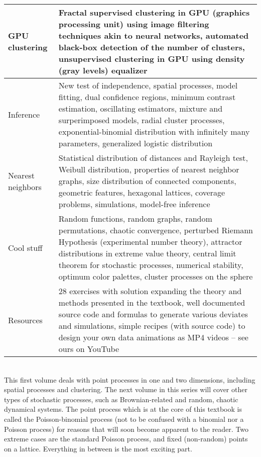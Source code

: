 \documentclass[10pt]{article}
\begin{document}
\begin{center}
\begin{tabular}{p{}p{}}
\hline
GPU clustering & Fractal supervised clustering in GPU (graphics processing unit) using image filtering techniques akin to neural networks, automated black-box detection of the number of clusters, unsupervised clustering in GPU using density (gray levels) equalizer \\
\hline
Inference &  New test of independence,  spatial processes, model fitting, dual confidence regions, minimum contrast estimation, oscillating estimators, mixture and surperimposed models, radial cluster processes,
exponential-binomial distribution with infinitely many parameters, generalized logistic distribution\\
\hline
Nearest neighbors & Statistical distribution of distances and Rayleigh test, Weibull distribution, properties of nearest neighbor graphs, size distribution of connected components, geometric features, hexagonal lattices, coverage problems, simulations, model-free inference \\
\hline
Cool stuff & Random functions, random graphs, random permutations, chaotic convergence, perturbed Riemann Hypothesis (experimental number theory), attractor distributions in extreme value theory,
central limit theorem for stochastic processes, numerical stability, optimum color palettes, cluster processes on the sphere\\
\hline
Resources & 28 exercises with solution expanding the theory and methods presented in the textbook, well documented source code and formulas to generate various deviates and simulations, simple recipes (with source code) to design your own data animations as MP4 videos -- see ours on YouTube\\
\hline
\end{tabular}
\end{center}


\quad \\

This first volume deals with point processes in one and two dimensions, including spatial processes and clustering. The next volume in this series will cover other types of stochastic processes, such as Brownian-related and random, chaotic dynamical systems. The point process which is at the core of this textbook is called the Poisson-binomial process (not to be confused with a binomial nor a Poisson process) for reasons that will soon become apparent to the reader. Two extreme cases are the standard Poisson process, and fixed (non-random) points on a lattice. Everything in between is the most exciting part.
\end{document}
